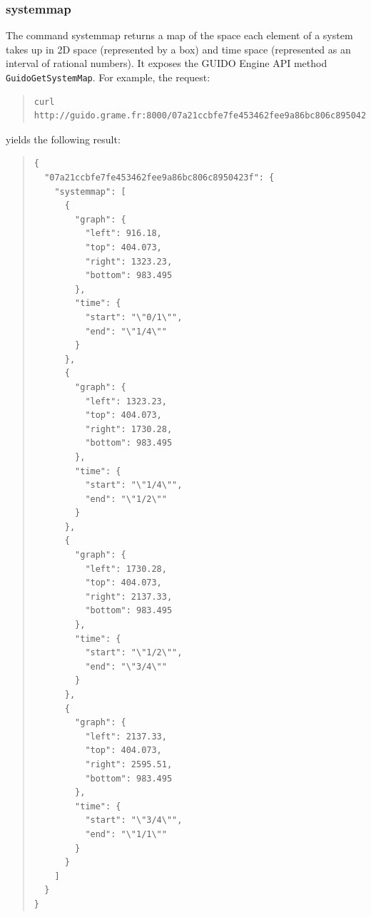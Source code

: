 \documentclass[a4paper]{article}
\begin{document}
\subsubsection{systemmap}
The command systemmap returns a map of the space each element of a system takes up in 2D space (represented by a box) and time space (represented as an interval of rational numbers).  It exposes the GUIDO Engine API method \verb=GuidoGetSystemMap=.  For example, the request:
\begin{quote}
\begingroup
\fontsize{7.5pt}{12pt}\selectfont
\begin{verbatim}
curl http://guido.grame.fr:8000/07a21ccbfe7fe453462fee9a86bc806c8950423f/systemmap
\end{verbatim}
\endgroup
\end{quote}
yields the following result:
\begin{quote}
\begin{verbatim}
{
  "07a21ccbfe7fe453462fee9a86bc806c8950423f": {
    "systemmap": [
      {
        "graph": {
          "left": 916.18,
          "top": 404.073,
          "right": 1323.23,
          "bottom": 983.495
        },
        "time": {
          "start": "\"0/1\"",
          "end": "\"1/4\""
        }
      },
      {
        "graph": {
          "left": 1323.23,
          "top": 404.073,
          "right": 1730.28,
          "bottom": 983.495
        },
        "time": {
          "start": "\"1/4\"",
          "end": "\"1/2\""
        }
      },
      {
        "graph": {
          "left": 1730.28,
          "top": 404.073,
          "right": 2137.33,
          "bottom": 983.495
        },
        "time": {
          "start": "\"1/2\"",
          "end": "\"3/4\""
        }
      },
      {
        "graph": {
          "left": 2137.33,
          "top": 404.073,
          "right": 2595.51,
          "bottom": 983.495
        },
        "time": {
          "start": "\"3/4\"",
          "end": "\"1/1\""
        }
      }
    ]
  }
}
\end{verbatim}
\end{quote}
\end{document}

